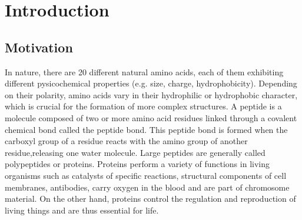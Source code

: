 
\chapter{Introduction}

\section{Motivation}

In nature, there are 20 different natural amino acids, each of them exhibiting different pysicochemical properties (e.g. size, charge, hydrophobicity)\cite{1}\cite{2}. Depending on their polarity, amino acids  vary in their hydrophilic or hydrophobic character, which is crucial for the formation of more complex structures. A peptide is a molecule composed of two or more amino acid residues linked through a covalent chemical bond called the peptide bond. This peptide bond is formed when the carboxyl group of a residue reacts with the amino group of another residue,releasing one water molecule. Large peptides are generally called polypeptides or proteins\cite{3}\cite{4}. Proteins perform a variety of functions in living organisms such as catalysts of specific reactions, structural components of cell membranes, antibodies, carry oxygen in the blood and are part of chromosome material. On the other hand, proteins control the regulation and reproduction of living things and are thus essential for life.%

